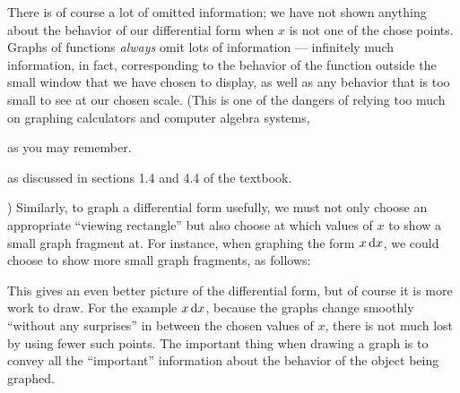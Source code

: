 \documentclass[12pt]{amsart}
\begin{document}
There is of course a lot of omitted information; we have not shown anything about the behavior of our differential form when $x$ is not one of the chose points.
Graphs of functions \emph{always} omit lots of information --- infinitely much information, in fact, corresponding to the behavior of the function outside the small window that we have chosen to display, as well as any behavior that is too small to see at our chosen scale.
(This is one of the dangers of relying too much on graphing calculators and computer algebra systems,
\begin{notextbook}as you may remember.\end{notextbook}%
\begin{stewart}as discussed in sections 1.4 and 4.4 of the textbook.\end{stewart})
Similarly, to graph a differential form usefully, we must not only choose an appropriate ``viewing rectangle'' but also choose at which values of $x$ to show a small graph fragment at.
For instance, when graphing the form $x\,{\mathrm{d} x}$, we could choose to show more small graph fragments, as follows:
\begin{center}
\end{center}
This gives an even better picture of the differential form, but of course it is more work to draw.
For the example $x\,{\mathrm{d} x}$, because the graphs change smoothly ``without any surprises'' in between the chosen values of $x$, there is not much lost by using fewer such points.
The important thing when drawing a graph is to convey all the ``important'' information about the behavior of the object being graphed.
\end{document}
